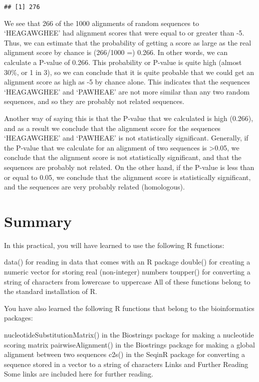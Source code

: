 \documentclass[
]{book}
\begin{document}
\begin{verbatim}
## [1] 276
\end{verbatim}

We see that 266 of the 1000 alignments of random sequences to `HEAGAWGHEE' had alignment scores that were equal to or greater than -5. Thus, we can estimate that the probability of getting a score as large as the real alignment score by chance is (266/1000 =) 0.266. In other words, we can calculate a P-value of 0.266. This probability or P-value is quite high (almost 30\%, or 1 in 3), so we can conclude that it is quite probable that we could get an alignment score as high as -5 by chance alone. This indicates that the sequences `HEAGAWGHEE' and `PAWHEAE' are not more similar than any two random sequences, and so they are probably not related sequences.

Another way of saying this is that the P-value that we calculated is high (0.266), and as a result we conclude that the alignment score for the sequences `HEAGAWGHEE' and `PAWHEAE' is not statistically significant. Generally, if the P-value that we calculate for an alignment of two sequences is \textgreater0.05, we conclude that the alignment score is not statistically significant, and that the sequences are probably not related. On the other hand, if the P-value is less than or equal to 0.05, we conclude that the alignment score is statistically significant, and the sequences are very probably related (homologous).

\hypertarget{summary-4}{%
\section{Summary}\label{summary-4}}

In this practical, you will have learned to use the following R functions:

data() for reading in data that comes with an R package
double() for creating a numeric vector for storing real (non-integer) numbers
toupper() for converting a string of characters from lowercase to uppercase
All of these functions belong to the standard installation of R.

You have also learned the following R functions that belong to the bioinformatics packages:

nucleotideSubstitutionMatrix() in the Biostrings package for making a nucleotide scoring matrix
pairwiseAlignment() in the Biostrings package for making a global alignment between two sequences
c2s() in the SeqinR package for converting a sequence stored in a vector to a string of characters
Links and Further Reading
Some links are included here for further reading.
\end{document}
